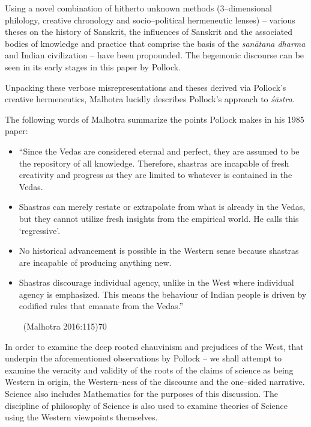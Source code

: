 Using a novel combination of hitherto unknown methods (3–dimen\-sion\-al philology, creative chronology and socio–political hermeneutic lenses) – various theses on the history of Sanskrit, the influences of Sanskrit and the associated bodies of knowledge and practice that comprise the basis of the \textit{sanātana dharma} and Indian civilization – have been propounded. The hegemonic discourse can be seen in its early stages in this paper by Pollock.

Unpacking these verbose misrepresentations and theses derived via Pollock’s creative hermeneutics, Malhotra lucidly describes Pollock’s approach to \textit{śāstra}.

The following words of Malhotra summarize the points Pollock makes in his 1985 paper:

\begin{itemize}
\item “Since the Vedas are considered eternal and perfect, they are assumed to be the repository of all knowledge. Therefore, shastras are incapable of fresh creativity and progress as they are limited to whatever is contained in the Vedas.

 \item Shastras can merely restate or extrapolate from what is already in the Vedas, but they cannot utilize fresh insights from the empirical world. He calls this ‘regressive’.

 \item No historical advancement is possible in the Western sense because shastras are incapable of producing anything new.

 \item Shastras discourage individual agency, unlike in the West where individual agency is emphasized. This means the behaviour of Indian people is driven by codified rules that emanate from the Vedas.”

~\hfill (Malhotra 2016:115)70

\end{itemize}

In order to examine the deep rooted chauvinism and prejudices of the West, that underpin the aforementioned observations by Pollock – we shall attempt to examine the veracity and validity of the roots of the claims of science as being Western in origin, the Western–ness of the discourse and the one–sided narrative. Science also includes Mathematics for the purposes of this discussion. The discipline of philosophy of Science is also used to examine theories of Science using the Western viewpoints themselves.

